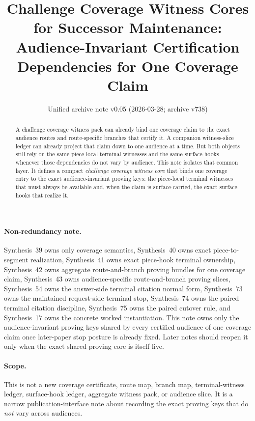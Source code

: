 \documentclass[11pt]{article}
\title{Challenge Coverage Witness Cores for Successor Maintenance:\\[0.5ex]
\large Audience-Invariant Certification Dependencies for One Coverage Claim}
\author{}
\date{Unified archive note v0.05 (2026-03-28; archive v738)}
\begin{document}
\maketitle

\begin{abstract}
A challenge coverage witness pack can already bind one coverage claim to the exact audience routes and route-specific branches that certify it.
A companion witness-slice ledger can already project that claim down to one audience at a time.
But both objects still rely on the same piece-local terminal witnesses and the same surface hooks whenever those dependencies do not vary by audience.
This note isolates that common layer.
It defines a compact \emph{challenge coverage witness core} that binds one coverage entry to the exact audience-invariant proving keys: the piece-local terminal witnesses that must always be available and, when the claim is surface-carried, the exact surface hooks that realize it.
\end{abstract}

\paragraph{Non-redundancy note.}
Synthesis~39 owns only coverage semantics, Synthesis~40 owns exact piece-to-segment realization, Synthesis~41 owns exact piece-hook terminal ownership, Synthesis~42 owns aggregate route-and-branch proving bundles for one coverage claim, Synthesis~43 owns audience-specific route-and-branch proving slices, Synthesis~54 owns the answer-side terminal citation normal form, Synthesis~73 owns the maintained request-side terminal stop, Synthesis~74 owns the paired terminal citation discipline, Synthesis~75 owns the paired cutover rule, and Synthesis~17 owns the concrete worked instantiation.
This note owns only the audience-invariant proving keys shared by every certified audience of one coverage claim once later-paper stop posture is already fixed. Later notes should reopen it only when the exact shared proving core is itself live.
\paragraph{Scope.}
This is not a new coverage certificate, route map, branch map, terminal-witness ledger, surface-hook ledger, aggregate witness pack, or audience slice.
It is a narrow publication-interface note about recording the exact proving keys that do \emph{not} vary across audiences.
\end{document}

